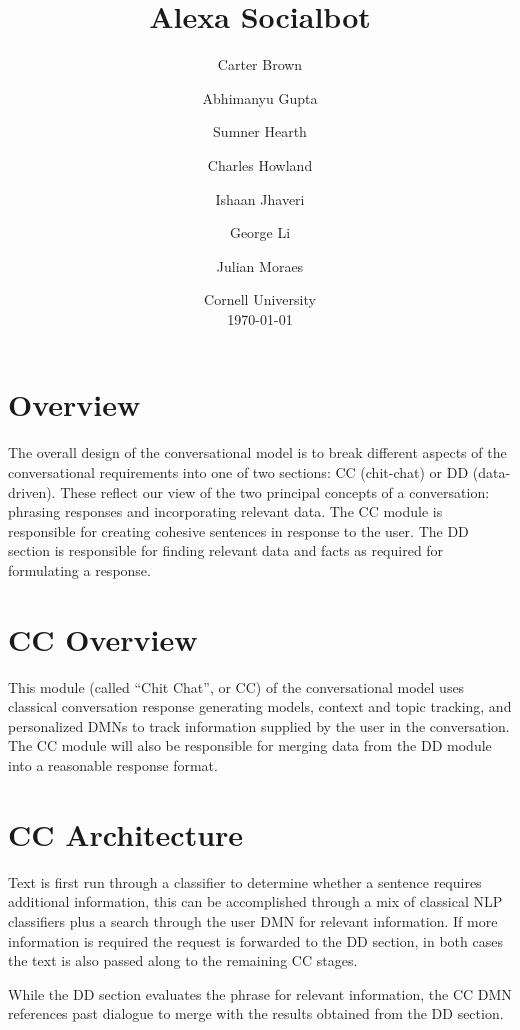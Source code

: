 \documentclass[10pt,twoside,twocolumn]{article}
\title{Alexa Socialbot}
\author{Carter Brown \and Abhimanyu Gupta \and Sumner Hearth \and Charles Howland \and Ishaan Jhaveri \and George Li \and Julian Moraes}
\date{%
    Cornell University\\%
    \today
}%
\begin{document}
\maketitle

\section{Overview}
The overall design of the conversational model is to break different aspects of the conversational requirements into one of two sections: CC (chit-chat) or DD (data-driven). These reflect our view of the two principal concepts of a conversation: phrasing responses and incorporating relevant data. The CC module is responsible for creating cohesive sentences in response to the user. The DD section is responsible for finding relevant data and facts as required for formulating a response.

\section{CC Overview}
This module (called ``Chit Chat'', or CC) of the conversational model uses classical conversation response generating models, context and topic tracking, and personalized DMNs \cite{Kumar:2015, Xiong2016} to track information supplied by the user in the conversation. The CC module will also be responsible for merging data from the DD module into a reasonable response format.

\section{CC Architecture}

Text is first run through a classifier to determine whether a sentence requires additional information, this can be accomplished through a mix of classical NLP classifiers plus a search through the user DMN for relevant information. If more information is required the request is forwarded to the DD section, in both cases the text is also passed along to the remaining CC stages.

\noindent
While the DD section evaluates the phrase for relevant information, the CC DMN references past dialogue to merge with the results obtained from the DD section. 
\end{document}
